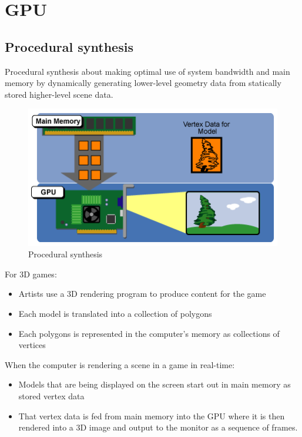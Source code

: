 
\section{GPU}\label{sec:gpu}

\subsection{Procedural synthesis}\label{subsec:procedural-synthesis}
Procedural synthesis about making optimal use of system bandwidth
and main memory by dynamically generating lower-level geometry
data from statically stored higher-level scene data.

\begin{figure}[h]
    \centering
    \includegraphics[width = \linewidth]{images/procedural-synthesis}
    \caption{Procedural synthesis}
    \label{fig:procedural-synthesis}
\end{figure}

For 3D games:
\begin{itemize}
    \item Artists use a 3D rendering program to produce content for the game
    \item Each model is translated into a collection of polygons
    \item Each polygons is represented in the computer's memory as collections of vertices
\end{itemize}
When the computer is rendering a scene in a game in real-time:
\begin{itemize}
    \item Models that are being displayed on the screen start out in main
memory as stored vertex data
    \item That vertex data is fed from main memory into the GPU where it is then rendered into a 3D image and output
    to the monitor as a sequence of frames.
\end{itemize}

